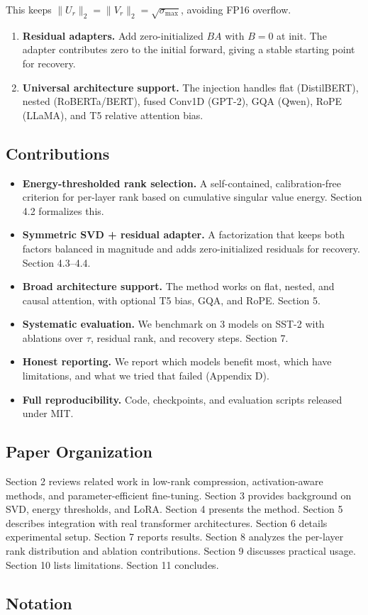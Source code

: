 This keeps $\|U_r\|_2 = \|V_r\|_2 = \sqrt{\sigma_\text{max}}$, avoiding FP16 overflow.

\begin{enumerate}
\item \textbf{Residual adapters.} Add zero-initialized $B A$ with $B = 0$ at init. The
  adapter contributes zero to the initial forward, giving a stable starting
  point for recovery.

\item \textbf{Universal architecture support.} The injection handles flat (DistilBERT),
  nested (RoBERTa/BERT), fused Conv1D (GPT-2), GQA (Qwen), RoPE (LLaMA),
  and T5 relative attention bias.

\end{enumerate}
\subsection{Contributions}

\begin{itemize}
\item \textbf{Energy-thresholded rank selection.} A self-contained, calibration-free
  criterion for per-layer rank based on cumulative singular value energy.
  Section 4.2 formalizes this.
\item \textbf{Symmetric SVD + residual adapter.} A factorization that keeps both
  factors balanced in magnitude and adds zero-initialized residuals for
  recovery. Section 4.3--4.4.
\item \textbf{Broad architecture support.} The method works on flat, nested, and causal
  attention, with optional T5 bias, GQA, and RoPE. Section 5.
\item \textbf{Systematic evaluation.} We benchmark on 3 models on SST-2 with ablations
  over $\tau$, residual rank, and recovery steps. Section 7.
\item \textbf{Honest reporting.} We report which models benefit most, which have
  limitations, and what we tried that failed (Appendix D).
\item \textbf{Full reproducibility.} Code, checkpoints, and evaluation scripts released
  under MIT.

\end{itemize}
\subsection{Paper Organization}

Section 2 reviews related work in low-rank compression, activation-aware 
methods, and parameter-efficient fine-tuning. Section 3 provides background 
on SVD, energy thresholds, and LoRA. Section 4 presents the method. Section 5 
describes integration with real transformer architectures. Section 6 details 
experimental setup. Section 7 reports results. Section 8 analyzes the 
per-layer rank distribution and ablation contributions. Section 9 discusses 
practical usage. Section 10 lists limitations. Section 11 concludes.



\subsection{Notation}
